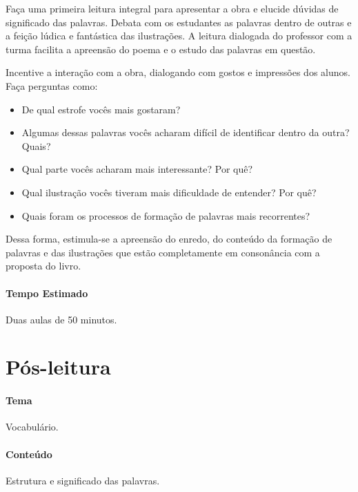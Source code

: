 \documentclass[11pt]{extarticle}
\begin{document}
Faça uma primeira leitura integral para apresentar a obra e elucide dúvidas de significado das palavras. Debata com os estudantes as palavras dentro de outras e a feição lúdica e fantástica das ilustrações. A leitura dialogada do professor com a turma facilita a apreensão do poema e o estudo das palavras em questão.

Incentive a interação com a obra, dialogando com gostos e impressões dos alunos. Faça perguntas como:

\begin{itemize}
\item De qual estrofe vocês mais gostaram?
\item Algumas dessas palavras vocês acharam difícil de identificar dentro da outra? Quais?
\item Qual parte vocês acharam mais interessante? Por quê?
\item Qual ilustração vocês tiveram mais dificuldade de entender? Por quê?
\item Quais foram os processos de formação de palavras mais recorrentes?
\end{itemize}

Dessa forma, estimula-se a apreensão do enredo, do conteúdo da formação de palavras e das ilustrações que estão completamente em consonância com a proposta do livro.

\paragraph{Tempo Estimado} Duas aulas de 50 minutos. 

\section{Pós-leitura}


\paragraph{Tema} Vocabulário. 

\paragraph{Conteúdo} Estrutura e significado das palavras.
\end{document}

